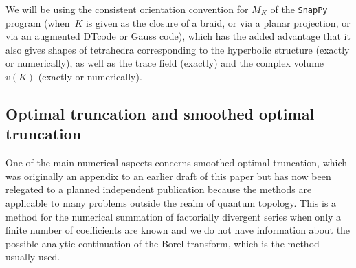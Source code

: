 \documentclass[pdftex]{sigma}
\numberwithin{equation}{section}
\def\tV{v} %
\begin{document}
We will be using the consistent orientation convention for $M_K$ of the
\texttt{SnapPy} program (when~$K$ is given as the closure of a braid, or
via a planar projection, or via an augmented DTcode or Gauss code),
which has the added advantage that it also gives shapes of tetrahedra
corresponding to the hyperbolic structure (exactly or numerically),
as well as the trace field (exactly) and the complex volume $\tV(K)$
(exactly or numerically).

\subsection{Optimal truncation and smoothed optimal truncation}
\label{sub.optimal}

One of the main numerical aspects concerns smoothed optimal truncation, which
was originally an appendix to an earlier draft of this paper but has now been
relegated to a planned independent publication \cite{GZ:optimal} because the methods
are applicable to many problems outside the realm of quantum topology. This is a
method for the numerical summation of factorially divergent series when only a
finite number of coefficients are known and we do not have information about the
possible analytic continuation of the Borel transform, which is the method usually
used.
\end{document}
